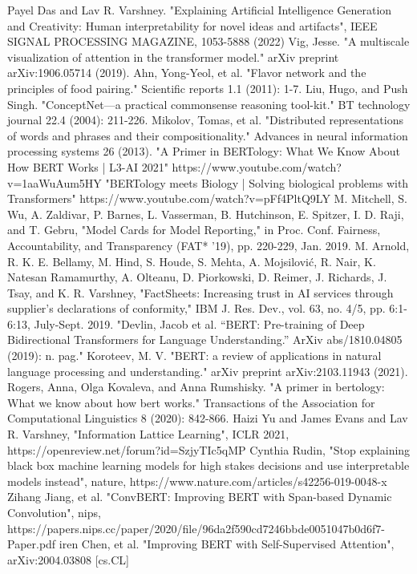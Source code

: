 \documentclass[]{article}
\begin{document}
\begin{thebibliography}{00}
 Payel Das and Lav R. Varshney. "Explaining Artificial Intelligence Generation and Creativity: Human interpretability for novel ideas and artifacts", IEEE SIGNAL PROCESSING MAGAZINE, 1053-5888 (2022)
 Vig, Jesse. "A multiscale visualization of attention in the transformer model." arXiv preprint arXiv:1906.05714 (2019).
 Ahn, Yong-Yeol, et al. "Flavor network and the principles of food pairing." Scientific reports 1.1 (2011): 1-7.
 Liu, Hugo, and Push Singh. "ConceptNet—a practical commonsense reasoning tool-kit." BT technology journal 22.4 (2004): 211-226.
 Mikolov, Tomas, et al. "Distributed representations of words and phrases and their compositionality." Advances in neural information processing systems 26 (2013).
 "A Primer in BERTology: What We Know About How BERT Works | L3-AI 2021" https://www.youtube.com/watch?v=1aaWuAum5HY
 "BERTology meets Biology | Solving biological problems with Transformers" https://www.youtube.com/watch?v=pFf4PltQ9LY
 M. Mitchell, S. Wu, A. Zaldivar, P. Barnes, L. Vasserman, B. Hutchinson, E. Spitzer, I. D. Raji, and T. Gebru, "Model Cards for Model Reporting," in Proc. Conf. Fairness, Accountability, and Transparency (FAT* '19), pp. 220-229, Jan. 2019.
 M. Arnold, R. K. E. Bellamy, M. Hind, S. Houde, S. Mehta, A. Mojsilović, R. Nair, K. Natesan Ramamurthy, A. Olteanu, D. Piorkowski, D. Reimer, J. Richards, J. Tsay, and K. R. Varshney, "FactSheets: Increasing trust in AI services through supplier's declarations of conformity," IBM J. Res. Dev., vol. 63, no. 4/5, pp. 6:1-6:13, July-Sept. 2019.  
 "Devlin, Jacob et al. “BERT: Pre-training of Deep Bidirectional Transformers for Language Understanding.” ArXiv abs/1810.04805 (2019): n. pag."
 Koroteev, M. V. "BERT: a review of applications in natural language processing and understanding." arXiv preprint arXiv:2103.11943 (2021).
 Rogers, Anna, Olga Kovaleva, and Anna Rumshisky. "A primer in bertology: What we know about how bert works." Transactions of the Association for Computational Linguistics 8 (2020): 842-866.
 Haizi Yu and James Evans and Lav R. Varshney, "Information Lattice Learning", ICLR 2021, https://openreview.net/forum?id=SzjyTIc5qMP
 Cynthia Rudin, "Stop explaining black box machine learning models for high stakes decisions and use interpretable models instead", nature, https://www.nature.com/articles/s42256-019-0048-x
 Zihang Jiang, et al. "ConvBERT: Improving BERT with Span-based Dynamic Convolution", nips,  https://papers.nips.cc/paper/2020/file/96da2f590cd7246bbde0051047b0d6f7-Paper.pdf
 iren Chen, et al. "Improving BERT with Self-Supervised Attention", arXiv:2004.03808 [cs.CL]
\end{thebibliography}
\end{document}

